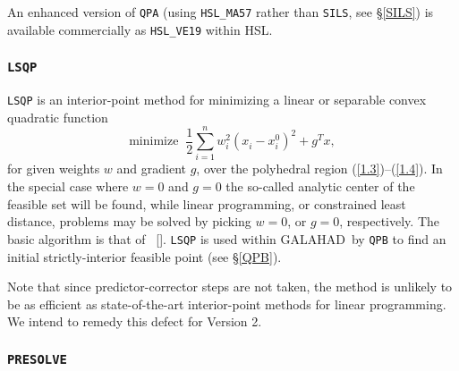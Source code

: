 \documentclass[acmtocl,acmnow]{acmtrans2m}
\newcommand{\req}[1]{(\ref{#1})}
\newcommand{\sfrac}[2]{{\scriptstyle \frac{#1}{#2}}}
\newcommand{\half}{\sfrac{1}{2}}
\newcommand{\gal}{{\sf GALAHAD}}
\newcommand{\ltsubsubsection}[1]{\subsubsection{{\tt #1}} \label{#1}}
\newcommand{\citebb}[1]{\citeauthor{#1}\ [\citeyear{#1}]}
\newcommand{\disp}[1]{\[{#1}\]}
\begin{document}
An enhanced version of {\tt QPA} (using {\tt HSL\_MA57} rather than {\tt SILS},
see \S\ref{SILS}) is available commercially as {\tt HSL\_VE19} within HSL.

\ltsubsubsection{LSQP}

{\tt LSQP} is an interior-point method for minimizing a linear or 
separable convex quadratic function 
\disp{\mbox{minimize}\;\; \half {\sum_{i=1}^n w_i^2 
 ( x_{i}^{ } - x_{i}^{0} )^{2}} + g^T x,}
for given weights $w$ and gradient $g$, 
over the polyhedral region \req{1.3}--\req{1.4}.
In the special case where $w = 0$ and $g = 0$
the so-called analytic center of the feasible set will be found,
while linear programming, or constrained least distance, problems
may be solved by picking $w = 0$, or $g = 0$, respectively.
The basic algorithm is that of \citebb{Zhan94}.
{\tt LSQP} is used within \gal\ by {\tt QPB} to find an initial
strictly-interior feasible point (see \S\ref{QPB}).

Note that since predictor-corrector steps are not taken, the method
is unlikely to be as efficient as state-of-the-art interior-point 
methods for linear programming. We intend to remedy this defect for
Version 2.

\ltsubsubsection{PRESOLVE}
\end{document}
